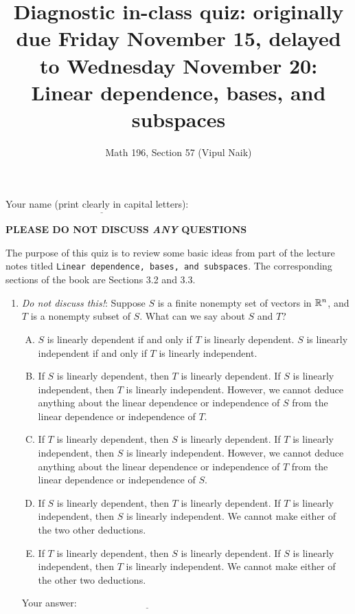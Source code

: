 \documentclass[10pt]{amsart}
\title{Diagnostic in-class quiz: originally due Friday November 15, delayed to Wednesday November 20: Linear dependence, bases, and subspaces}
\author{Math 196, Section 57 (Vipul Naik)}
\begin{document}
\maketitle

Your name (print clearly in capital letters): $\underline{\qquad\qquad\qquad\qquad\qquad\qquad\qquad\qquad\qquad\qquad}$

{\bf PLEASE DO NOT DISCUSS {\em ANY} QUESTIONS}

The purpose of this quiz is to review some basic ideas from part of
the lecture notes titled {\tt Linear dependence, bases, and
  subspaces}. The corresponding sections of the book are Sections 3.2
and 3.3.

\begin{enumerate}
\item {\em Do not discuss this!}: Suppose $S$ is a finite nonempty set
  of vectors in $\mathbb{R}^n$, and $T$ is a nonempty subset of $S$. What can
  we say about $S$ and $T$?

  \begin{enumerate}[(A)]
  \item $S$ is linearly dependent if and only if $T$ is linearly
    dependent. $S$ is linearly independent if and only if $T$ is
    linearly independent.
  \item If $S$ is linearly dependent, then $T$ is linearly
    dependent. If $S$ is linearly independent, then $T$ is linearly
    independent. However, we cannot deduce anything about the linear
    dependence or independence of $S$ from the linear dependence or
    independence of $T$.
  \item If $T$ is linearly dependent, then $S$ is linearly
    dependent. If $T$ is linearly independent, then $S$ is linearly
    independent. However, we cannot deduce anything about the linear
    dependence or independence of $T$ from the linear dependence or
    independence of $S$.
  \item If $S$ is linearly dependent, then $T$ is linearly
    dependent. If $T$ is linearly independent, then $S$ is linearly
    independent. We cannot make either of the two other deductions.
  \item If $T$ is linearly dependent, then $S$ is linearly
    dependent. If $S$ is linearly independent, then $T$ is linearly
    independent. We cannot make either of the other two deductions.
  \end{enumerate}
    
  \vspace{0.1in}
  Your answer: $\underline{\qquad\qquad\qquad\qquad\qquad\qquad\qquad}$
  \vspace{0.1in}


\end{enumerate}
\end{document}
